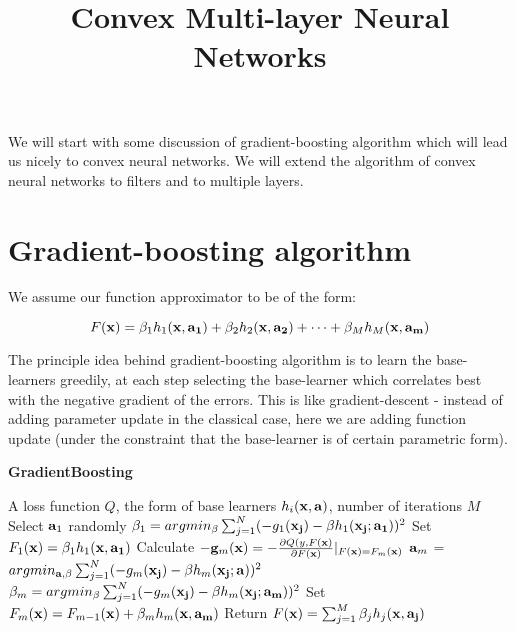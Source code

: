 \documentclass{article}
\title{Convex Multi-layer Neural Networks}
\begin{document}
\maketitle

We will start with some discussion of gradient-boosting algorithm which will lead us nicely to convex neural networks. We will extend the algorithm of convex neural networks to filters and to multiple layers.

\section{Gradient-boosting algorithm}
\label{sec:grad_boosting}
We assume our function approximator to be of the form:

\begin{equation}
	F({\bf x}) = \beta_1 h_1({\bf x, a_1}) + \beta_2 h_2({\bf x, a_2}) + \dots + \beta_M h_M({\bf x, a_m})  
\end{equation}

The principle idea behind gradient-boosting algorithm is to learn the base-learners greedily, at each step selecting the base-learner which correlates best with the negative gradient of the errors. This is like gradient-descent - instead of adding parameter update in the classical case, here we are adding function update (under the constraint that the base-learner is of certain parametric form).

\begin{algorithm}
\caption{{\bf GradientBoosting} \cite{friedman2001greedy}}\label{algo:gradient_boosting}
\begin{algorithmic}[1]
 A loss function $Q$, the form of base learners $h_{i}({\bf x, a})$, number of iterations $M$
\STATE Select ${\bf a}_1$ randomly 
\STATE $\beta_1 = argmin_{\beta}  \sum_{j = 1}^{N} (- g_1({\bf x_j}) - \beta h_1({\bf x_j;a_1}))^2$
\STATE Set $F_1({\bf x}) = \beta_1 h_1({\bf x, a_1})$
\STATE Calculate $-{\bf g}_m({\bf x}) = - \frac{\partial Q(y, F{\bf(x)}}{\partial F{\bf(x)}}|_{F({\bf x}) = F_m({\bf x})}$
\STATE ${\bf a}_m$ = $argmin_{{\bf a}, \beta} \sum_{j = 1}^{N} (- g_m({\bf x_j}) - \beta h_m({\bf x_j;a}))^2$
\STATE $\beta_m = argmin_{\beta}  \sum_{j = 1}^{N} (- g_m({\bf x_j}) - \beta h_m({\bf x_j;a_m}))^2$
\STATE Set $F_m({\bf x}) = F_{m - 1}({\bf x}) + \beta_m h_m({\bf x, a_m})$
\ENDFOR
\STATE Return $F({\bf x}) = \sum_{j = 1}^{M} \beta_j h_j({\bf x, a_j})$
\end{algorithmic}
\end{algorithm}
\end{document}
